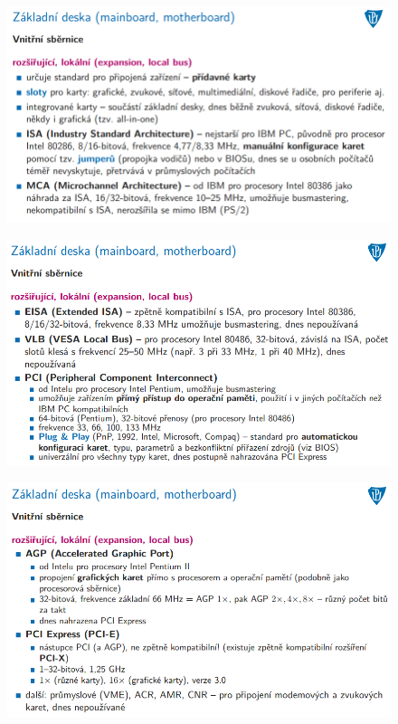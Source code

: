 \documentclass[10pt,a4paper]{article}
\begin{document}
\begin{figure} [h]
	\includegraphics[scale=0.65]{img/prvni_odstavec/otazka4/zakladni_deska7.png}	
\end{figure}

\begin{figure} [h]
	\includegraphics[scale=0.65]{img/prvni_odstavec/otazka4/zakladni_deska8.png}	
\end{figure}

\begin{figure} [h]
	\includegraphics[scale=0.65]{img/prvni_odstavec/otazka4/zakladni_deska9.png}	
\end{figure}
\end{document}
